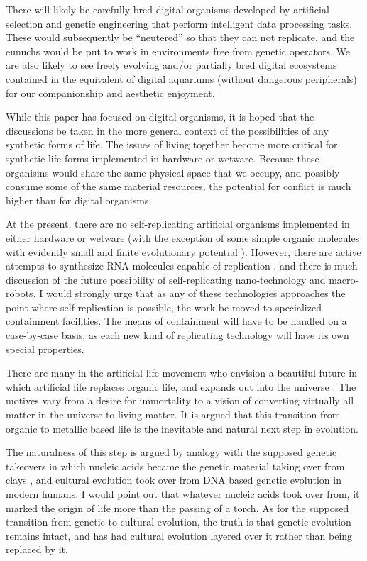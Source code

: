 There will likely be carefully bred digital organisms developed by
artificial selection and genetic engineering that perform intelligent
data processing tasks.  These would subsequently be ``neutered'' so that
they can not replicate, and the eunuchs would be put to work in
environments free from genetic operators.  We are also likely to see
freely evolving and/or partially bred digital ecosystems contained
in the equivalent of digital aquariums (without dangerous peripherals)
for our companionship and aesthetic enjoyment.

While this paper has focused on digital organisms, it is hoped that
the discussions be taken in the more general context of the possibilities
of any synthetic forms of life.  The issues of living together become
more critical for synthetic life forms implemented in hardware or
wetware.  Because these organisms would share the same physical space
that we occupy, and possibly consume some of the same material resources,
the potential for conflict is much higher than for digital organisms.

At the present, there are no self-replicating artificial organisms
implemented in either hardware or wetware (with the exception of some
simple organic molecules with evidently small and finite evolutionary
potential \cite{Rebe1,Rebe3,Rebe2}).  However, there are active
attempts to synthesize RNA molecules capable of replication
\cite{Joyc2,Joyc1}, and there is much discussion of the future
possibility of self-replicating nano-technology and macro-robots.
I would strongly urge that as any of these technologies approaches the
point where self-replication is possible, the work be moved to specialized
containment facilities.  The means of containment will have to be handled
on a case-by-case basis, as each new kind of replicating technology will
have its own special properties.

There are many in the artificial life movement who envision a beautiful
future in which artificial life replaces organic life, and expands out
into the universe \cite{Levy1,Levy2,Mora1,Mora2,Mora3}.  The motives
vary from a desire for immortality to a vision of converting virtually
all matter in the universe to living matter.  It is argued that this
transition from organic to metallic based life is the inevitable and
natural next step in evolution.

The naturalness of this step is argued by analogy with the supposed
genetic takeovers in which nucleic acids became the genetic material
taking over from clays \cite{CaSm}, and cultural evolution took over
from DNA based genetic evolution in modern humans.  I would point out
that whatever nucleic acids took over from, it marked the origin of
life more than the passing of a torch.  As for the supposed transition
from genetic to cultural evolution, the truth is that genetic evolution
remains intact, and has had cultural evolution layered over it rather
than being replaced by it. 

